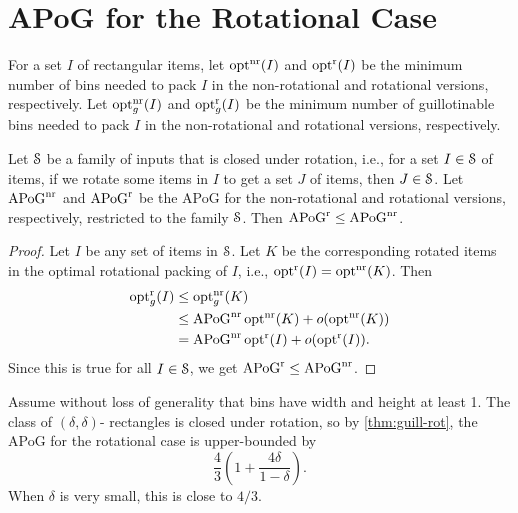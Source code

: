 \section{APoG for the Rotational Case}
\label{sec:guill-rot}

\begin{theorem}
\label{thm:guill-rot}
For a set $I$ of rectangular items,
let $\operatorname{opt}^{\mathrm{nr}}(I)$ and $\operatorname{opt}^{\mathrm{r}}(I)$ be the minimum number of bins
needed to pack $I$ in the non-rotational and rotational versions, respectively.
Let $\operatorname{opt}^{\mathrm{nr}}_g(I)$ and $\operatorname{opt}^{\mathrm{r}}_g(I)$ be the minimum number of guillotinable bins
needed to pack $I$ in the non-rotational and rotational versions, respectively.

Let $\mathcal{S}$ be a family of inputs that is closed under rotation, i.e.,
for a set $I \in \mathcal{S}$ of items, if we rotate some items in $I$ to get a set $J$ of items,
then $J \in \mathcal{S}$.
Let $\mathrm{APoG}^{\mathrm{nr}}$ and $\mathrm{APoG}^{\mathrm{r}}$ be the APoG for the non-rotational
and rotational versions, respectively, restricted to the family $\mathcal{S}$.
Then $\mathrm{APoG}^{\mathrm{r}} \le \mathrm{APoG}^{\mathrm{nr}}$.
\end{theorem}
\begin{proof}
Let $I$ be any set of items in $\mathcal{S}$. Let $K$ be the corresponding rotated items
in the optimal rotational packing of $I$, i.e., $\operatorname{opt}^{\mathrm{r}}(I) = \operatorname{opt}^{\mathrm{nr}}(K)$. Then
\begin{align*}
\operatorname{opt}^{\mathrm{r}}_g(I) &\le \operatorname{opt}^{\mathrm{nr}}_g(K)
\\ &\le \mathrm{APoG}^{\mathrm{nr}}\operatorname{opt}^{\mathrm{nr}}(K) + o(\operatorname{opt}^{\mathrm{nr}}(K))
\\ &= \mathrm{APoG}^{\mathrm{nr}}\operatorname{opt}^{\mathrm{r}}(I) + o(\operatorname{opt}^{\mathrm{r}}(I)).
\end{align*}
Since this is true for all $I \in \mathcal{S}$, we get $\mathrm{APoG}^{\mathrm{r}} \le \mathrm{APoG}^{\mathrm{nr}}$.
\end{proof}

Assume without loss of generality that bins have width and height at least 1.
The class of $(\delta, \delta)$-\thin{} rectangles is closed under rotation,
so by \cref{thm:guill-rot}, the APoG for the rotational case is upper-bounded by
\[ \frac{4}{3}\left(1+\frac{4\delta}{1-\delta}\right). \]
When $\delta$ is very small, this is close to $4/3$.
